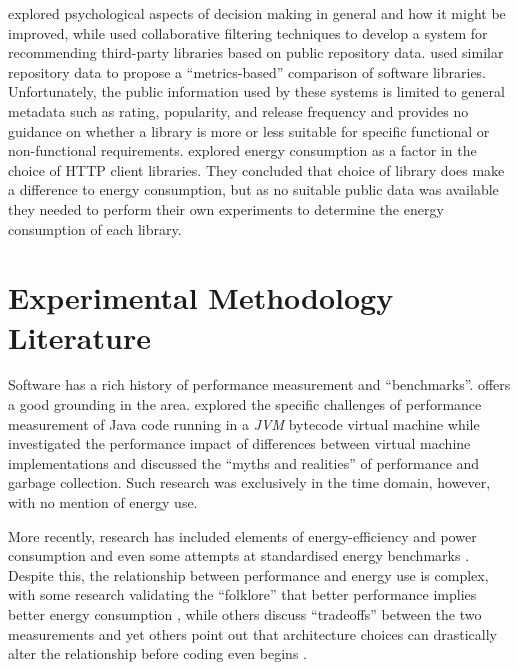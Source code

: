 \citet{Milkman2009} explored psychological aspects of decision making in general and how it might be improved, while \citet{Nguyen2020} used collaborative filtering techniques to develop a system for recommending third-party libraries based on public repository data. \citet{delaMora2018a} used similar repository data to propose a \enquote{metrics-based} comparison of software libraries. Unfortunately, the public information used by these systems is limited to general metadata such as rating, popularity, and release frequency and provides no guidance on whether a library is more or less suitable for specific functional or non-functional requirements. \citet{Anwar2020} explored energy consumption as a factor in the choice of HTTP client libraries. They concluded that choice of library does make a difference to energy consumption, but as no suitable public data was available they needed to perform their own experiments to determine the energy consumption of each library.

\section{Experimental Methodology Literature}
\label{literature:methods}

Software has a rich history of performance measurement and \enquote{benchmarks}. \citet{Lilja2000} offers a good grounding in the area. \citet{Georges2007} explored the specific challenges of performance measurement of Java code running in a \emph{JVM} bytecode virtual machine while \citet{Gu2006} investigated the performance impact of differences between virtual machine implementations and \citet{Blackburn2004} discussed the \enquote{myths and realities} of performance and garbage collection. Such research was exclusively in the time domain, however, with no mention of energy use.

\label{A8}
More recently, research has included elements of energy-efficiency and power consumption \citep{Capra2012} \citep{Li2014b} and even some attempts at standardised energy benchmarks \citep{SPEC2008}. Despite this, the relationship between performance and energy use is complex, with some research validating the \enquote{folklore} that better performance implies better energy consumption \citep{Yuki2013}, while others discuss \enquote{tradeoffs} between the two measurements \citep{Joseph2001} and yet others point out that architecture choices can drastically alter the relationship before coding even begins \citep{Khomh2018}.

